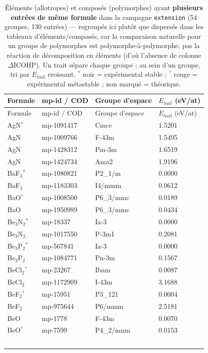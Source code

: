 \begin{longtable}{@{}llll@{}}
\caption{Éléments (allotropes) et composés (polymorphes) ayant \textbf{plusieurs entrées de même formule} dans la campagne \texttt{extension} (54 groupes, 130 entrées) --- regroupés ici plutôt que dispersés dans les tableaux d'éléments/composés, car la comparaison naturelle pour un groupe de polymorphes est polymorphe-à-polymorphe, pas la réaction de décomposition en éléments (d'où l'absence de colonne $\Delta$ICOHP). Un trait sépare chaque groupe ; au sein d'un groupe, tri par $E_{hull}$ croissant. $^*$ noir = expérimental stable ; \textcolor{red}{$^*$} rouge = expérimental métastable ; non marqué = théorique.}\label{tab:ext-polymorphs}\\
\toprule
Formule & mp-id / COD & Groupe d'espace & $E_{hull}$ (eV/at) \\
\midrule
\endfirsthead
\toprule
Formule & mp-id / COD & Groupe d'espace & $E_{hull}$ (eV/at) \\
\midrule
\endhead
\bottomrule
\endfoot
AgN\textcolor{red}{$^*$} & mp-1091417 & Cmce & 1.5201 \\
AgN & mp-1009766 & F-43m & 1.5495 \\
AgN & mp-1428312 & Pm-3m & 1.6519 \\
AgN & mp-1424734 & Ama2 & 1.9196 \\
\midrule
BaF$_{3}$$^*$ & mp-1080821 & P2\_1/m & 0.0000 \\
BaF$_{3}$ & mp-1183303 & I4/mmm & 0.0612 \\
\midrule
BaO\textcolor{red}{$^*$} & mp-1008500 & P6\_3/mmc & 0.0189 \\
BaO & mp-1950989 & P6\_3/mmc & 0.0434 \\
\midrule
Be$_{3}$N$_{2}$$^*$ & mp-18337 & Ia-3 & 0.0000 \\
Be$_{3}$N$_{2}$ & mp-1017550 & P-3m1 & 0.2081 \\
\midrule
Be$_{3}$P$_{2}$$^*$ & mp-567841 & Ia-3 & 0.0000 \\
Be$_{3}$P$_{2}$ & mp-1084771 & Pn-3m & 0.1567 \\
\midrule
BeCl$_{2}$\textcolor{red}{$^*$} & mp-23267 & Ibam & 0.0087 \\
BeCl$_{2}$ & mp-1172909 & I-43m & 3.1688 \\
\midrule
BeF$_{2}$\textcolor{red}{$^*$} & mp-15951 & P3\_121 & 0.0004 \\
BeF$_{2}$ & mp-975644 & P6/mmm & 2.5181 \\
\midrule
BeO & mp-1778 & F-43m & 0.0070 \\
BeO\textcolor{red}{$^*$} & mp-7599 & P4\_2/mnm & 0.0153 \\
$$
\end{longtable}
